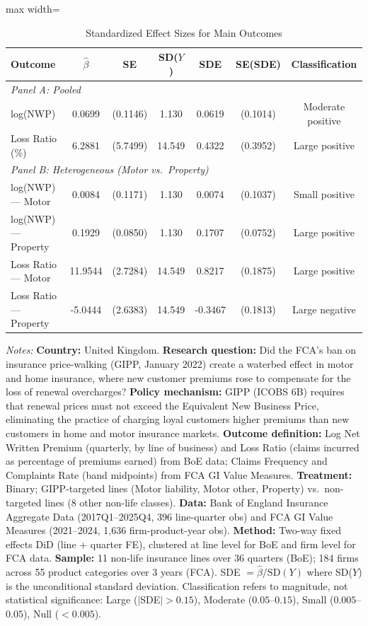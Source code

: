 \begin{table}[H]
\centering
\caption{Standardized Effect Sizes for Main Outcomes}
\label{tab:sde}
\begin{adjustbox}{max width=\textwidth}
\begin{tabular}{lcccccc}
\toprule
Outcome & $\hat{\beta}$ & SE & SD($Y$) & SDE & SE(SDE) & Classification \\
\midrule
\multicolumn{7}{l}{\textit{Panel A: Pooled}} \\
log(NWP) & 0.0699 & (0.1146) & 1.130 & 0.0619 & (0.1014) & Moderate positive \\
Loss Ratio (\%) & 6.2881 & (5.7499) & 14.549 & 0.4322 & (0.3952) & Large positive \\
\midrule
\multicolumn{7}{l}{\textit{Panel B: Heterogeneous (Motor vs.~Property)}} \\
log(NWP) --- Motor & 0.0084 & (0.1171) & 1.130 & 0.0074 & (0.1037) & Small positive \\
log(NWP) --- Property & 0.1929 & (0.0850) & 1.130 & 0.1707 & (0.0752) & Large positive \\
Loss Ratio --- Motor & 11.9544 & (2.7284) & 14.549 & 0.8217 & (0.1875) & Large positive \\
Loss Ratio --- Property & -5.0444 & (2.6383) & 14.549 & -0.3467 & (0.1813) & Large negative \\
\bottomrule
\end{tabular}
\end{adjustbox}

\vspace{0.3em}
\begin{minipage}{\textwidth}
\footnotesize
\textit{Notes:} \textbf{Country:} United Kingdom. \textbf{Research question:} Did the FCA's ban on insurance price-walking (GIPP, January 2022) create a waterbed effect in motor and home insurance, where new customer premiums rose to compensate for the loss of renewal overcharges? \textbf{Policy mechanism:} GIPP (ICOBS 6B) requires that renewal prices must not exceed the Equivalent New Business Price, eliminating the practice of charging loyal customers higher premiums than new customers in home and motor insurance markets. \textbf{Outcome definition:} Log Net Written Premium (quarterly, by line of business) and Loss Ratio (claims incurred as percentage of premiums earned) from BoE data; Claims Frequency and Complaints Rate (band midpoints) from FCA GI Value Measures. \textbf{Treatment:} Binary; GIPP-targeted lines (Motor liability, Motor other, Property) vs.\ non-targeted lines (8 other non-life classes). \textbf{Data:} Bank of England Insurance Aggregate Data (2017Q1--2025Q4, 396 line-quarter obs) and FCA GI Value Measures (2021--2024, 1,636 firm-product-year obs). \textbf{Method:} Two-way fixed effects DiD (line + quarter FE), clustered at line level for BoE and firm level for FCA data. \textbf{Sample:} 11 non-life insurance lines over 36 quarters (BoE); 184 firms across 55 product categories over 3 years (FCA). SDE $= \hat{\beta} / \text{SD}(Y)$ where SD($Y$) is the unconditional standard deviation. Classification refers to magnitude, not statistical significance: Large ($|$SDE$| > 0.15$), Moderate ($0.05$--$0.15$), Small ($0.005$--$0.05$), Null ($< 0.005$).
\end{minipage}
\end{table}
